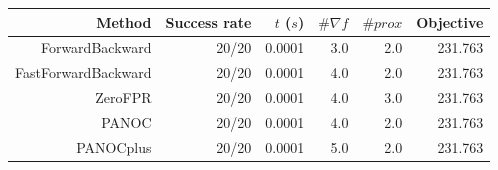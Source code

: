 \begin{tabular}{rrrrrr}
  \toprule
  \textbf{Method} & \textbf{Success rate} & \textbf{$t$ ($s$)} & \textbf{$\#\nabla f$} & \textbf{$\#prox$} & \textbf{Objective} \\
  \midrule
  ForwardBackward & 20/20 & 0.0001 & 3.0 & 2.0 & 231.763 \\
  FastForwardBackward & 20/20 & 0.0001 & 4.0 & 2.0 & 231.763 \\
  ZeroFPR & 20/20 & 0.0001 & 4.0 & 3.0 & 231.763 \\
  PANOC & 20/20 & 0.0001 & 4.0 & 2.0 & 231.763 \\
  PANOCplus & 20/20 & 0.0001 & 5.0 & 2.0 & 231.763 \\
  \bottomrule
\end{tabular}
